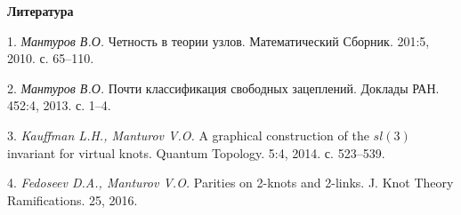 \smallskip \centerline{\bf Литература}\nopagebreak

1. {\it Мантуров В.О.} Четность в теории узлов. Математический Сборник. 201:5, 2010. с. 65--110.

2. {\it Мантуров В.О.} Почти классификация свободных зацеплений. Доклады РАН. 452:4, 2013. с. 1--4.

3. {\it Kauffman L.H., Manturov V.O.} A graphical construction of the $sl(3)$ invariant for virtual knots. Quantum Topology. 5:4, 2014. с. 523--539.

4. {\it Fedoseev D.A., Manturov V.O.} Parities on 2-knots and 2-links. J. Knot Theory Ramifications. 25, 2016.

